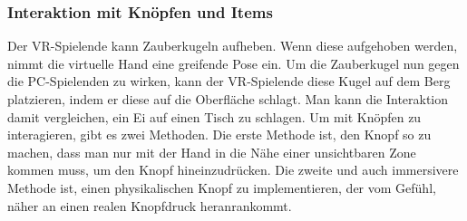 \subsubsection{Interaktion mit Knöpfen und Items}
Der VR-Spielende kann Zauberkugeln aufheben. Wenn diese aufgehoben werden, nimmt die virtuelle Hand eine greifende Pose ein. Um die Zauberkugel nun gegen die PC-Spielenden zu wirken, kann der VR-Spielende diese Kugel auf dem Berg platzieren, indem er diese auf die Oberfläche schlagt. Man kann die Interaktion damit vergleichen, ein Ei auf einen Tisch zu schlagen. Um mit Knöpfen zu interagieren, gibt es zwei Methoden. Die erste Methode ist, den Knopf so zu machen, dass man nur mit der Hand in die Nähe einer unsichtbaren Zone kommen muss, um den Knopf hineinzudrücken. Die zweite und auch immersivere Methode ist, einen physikalischen Knopf zu implementieren, der vom Gefühl, näher an einen realen Knopfdruck heranrankommt.